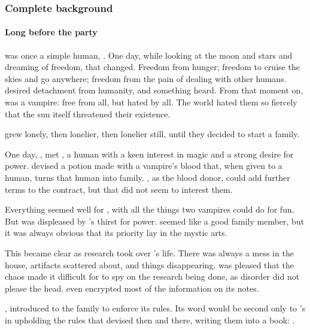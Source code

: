 \subsubsection{Complete background}

\paragraph{Long before the party}

 was once a simple human, . One day, while looking at the moon and stars and dreaming of freedom, that changed. Freedom from hunger; freedom to cruise the skies and go anywhere; freedom from the pain of dealing with other humans.  desired detachment from humanity, and something heard. From that moment on,  was a vampire: free from all, but hated by all. The world hated them so fiercely that the sun itself threatened their existence.

 grew lonely, then lonelier, then lonelier still, until they decided to start a family.

One day, ,  met , a human with a keen interest in magic and a strong desire for power.  devised a potion made with a vampire's blood that, when given to a human, turns that human into family. , as the blood donor, could add further terms to the contract, but that did not seem to interest them.

Everything seemed well for , with all the things two vampires could do for fun. But  was displeased by 's thirst for power.  seemed like a good family member, but it was always obvious that its priority lay in the mystic arts.

This became clear as research took over 's life. There was always a mess in the house, artifacts scattered about, and things disappearing.  was pleased that the chaos made it difficult for  to spy on the research being done, as disorder did not please the head.  even encrypted most of the information on its notes.

,  introduced  to the family to enforce its rules. Its word would be second only to 's in upholding the rules that  devised then and there, writing them into a book: .

